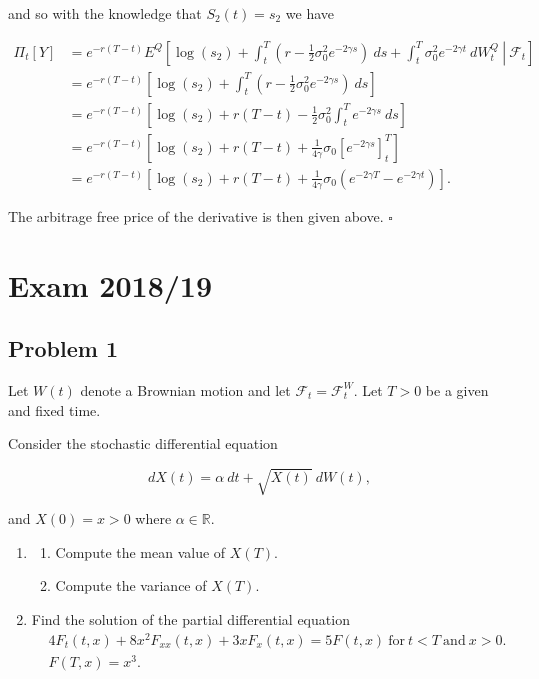 \documentclass[
]{book}
\providecommand{\tightlist}{%
  \setlength{\itemsep}{0pt}\setlength{\parskip}{0pt}}
\begin{document}
and so with the knowledge that \(S_2(t)=s_2\) we have

\begin{align*}
\Pi_t[Y]&=e^{-r(T-t)}E^Q\left[\left.\log(s_2)+\int_t^T\left(r-\frac{1}{2}\sigma_0^2e^{-2\gamma s}\right)\ ds + \int_t^T \sigma_0^2e^{-2\gamma t}\ dW^Q_t\ \right\vert\ \mathcal{F}_t\right]\\
&=e^{-r(T-t)}\left[\log(s_2)+\int_t^T\left(r-\frac{1}{2}\sigma_0^2e^{-2\gamma s}\right)\ ds\right]\\
&=e^{-r(T-t)}\left[\log(s_2)+r(T-t)-\frac{1}{2}\sigma_0^2\int_t^Te^{-2\gamma s}\ ds\right]\\
&=e^{-r(T-t)}\left[\log(s_2)+r(T-t)+\frac{1}{4\gamma}\sigma_0\left[e^{-2\gamma s}\right]_t^T\right]\\
&=e^{-r(T-t)}\left[\log(s_2)+r(T-t)+\frac{1}{4\gamma}\sigma_0(e^{-2\gamma T}-e^{-2\gamma t})\right].
\end{align*}

The arbitrage free price of the derivative is then given above. \(\square\)

\noindent\makebox[\linewidth]{\rule{\textwidth}{0.4pt}}
\pagebreak

\hypertarget{exam-201819}{%
\section{Exam 2018/19}\label{exam-201819}}

\hypertarget{problem-1-1}{%
\subsection{Problem 1}\label{problem-1-1}}

Let \(W(t)\) denote a Brownian motion and let \(\mathcal{F}_t=\mathcal{F}_t^W\). Let \(T>0\) be a given and fixed time.

Consider the stochastic differential equation

\[
dX(t)=\alpha\ dt+\sqrt{X(t)}\ dW(t),
\]

and \(X(0)=x>0\) where \(\alpha\in\mathbb{R}\).

\begin{enumerate}
\def\labelenumi{\alph{enumi}.}
\item
  \begin{enumerate}
  \def\labelenumii{\roman{enumii}.}
  \tightlist
  \item
    Compute the mean value of \(X(T)\).
  \item
    Compute the variance of \(X(T)\).
  \end{enumerate}
\item
  Find the solution of the partial differential equation
  \begin{align*}
    &4F_t(t,x)+8x^2F_{xx}(t,x)+3xF_x(t,x)=5F(t,x)\ \text{for}\ t<T\ \text{and}\ x>0.\\
    &F(T,x)=x^3.
    \end{align*}
\end{enumerate}
\end{document}

